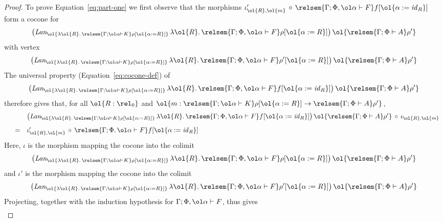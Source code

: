 \documentclass{lmcs}
\theoremstyle{plain}\newtheorem{satz}[thm]{Satz}
\renewcommand{\id}{\mathit{id}}
\begin{document}
\begin{proof}
\vspace*{0.1in}

To prove Equation~\ref{eq:part-one} we first observe that the
morphisms $\iota'_{\ol{R}, \ol{m}} \,\circ\, \relsem{\Gamma; \Phi,
  \ol\alpha \vdash F}f[\ol{\alpha := \id_R}]$ form a cocone for
\[
\big(\textit{Lan}_{\ol{\lambda \ol{R}.\,\relsem{\Gamma; \ol\alpha
      \vdash K}\rho[\ol{\alpha := R}]}}\, \lambda
\ol{R}.\,\relsem{\Gamma; \Phi, \ol\alpha \vdash F}\rho[\ol{\alpha :=
    R}]\big)\, \ol{\relsem{\Gamma; \Phi \vdash A}\rho'}
\]
with vertex 
\[
\big(\textit{Lan}_{\ol{\lambda \ol{R}.\,\relsem{\Gamma; \ol\alpha
      \vdash K}\rho[\ol{\alpha := R}]}}\, \lambda
\ol{R}.\,\relsem{\Gamma; \Phi, \ol\alpha \vdash F}\rho'[\ol{\alpha :=
    R}]\big)\, \ol{\relsem{\Gamma; \Phi \vdash A}\rho'}
\]
The universal property (Equation~\ref{eq:cocone-def}) of
\[
\big(\textit{Lan}_{\ol{\lambda \ol{R}.\,\relsem{\Gamma; \ol\alpha
      \vdash K}\rho[\ol{\alpha := R}]}}\, \lambda
\ol{R}.\,\relsem{\Gamma; \Phi, \ol\alpha \vdash F}f[\ol{\alpha :=
    \id_R}]\big)\, \ol{\relsem{\Gamma; \Phi \vdash A}\rho'}
\]
therefore gives that, for all $\ol{R : \rel_0}$ and $\ol{m :
  \relsem{\Gamma; \ol\alpha \vdash K}\rho[\ol{\alpha := R}] \to
  \relsem{\Gamma; \Phi \vdash A}\rho'}$,
\[\begin{array}{lll}
& & \big(\textit{Lan}_{\ol{\lambda \ol{R}.\,\relsem{\Gamma; \ol\alpha
      \vdash K}\rho[\ol{\alpha := R}]}}\, \lambda
\ol{R}.\,\relsem{\Gamma; \Phi, \ol\alpha \vdash F}f[\ol{\alpha :=
    \id_R}]\big)\, \ol{\relsem{\Gamma; \Phi \vdash A}\rho'} \,\circ\,
\iota_{\ol{R}, \ol{m}}\\[2ex]
& = & \iota'_{\ol{R}, \ol{m}} \,\circ\, \relsem{\Gamma; \Phi,
  \ol\alpha \vdash F}f[\ol{\alpha := \id_R}]
\end{array}\]
Here, $\iota$ is the morphism mapping the cocone into the colimit
\[
\big(\textit{Lan}_{\ol{\lambda \ol{R}.\,\relsem{\Gamma; \ol\alpha
      \vdash K}\rho[\ol{\alpha := R}]}}\, \lambda
\ol{R}.\,\relsem{\Gamma; \Phi, \ol\alpha \vdash F}\rho[\ol{\alpha :=
    R}]\big)\, \ol{\relsem{\Gamma; \Phi \vdash A}\rho'}
\]
and $\iota'$ is the morphism mapping the cocone into the colimit
\[
\big(\textit{Lan}_{\ol{\lambda \ol{R}.\,\relsem{\Gamma; \ol\alpha
      \vdash K}\rho[\ol{\alpha := R}]}}\, \lambda
\ol{R}.\,\relsem{\Gamma; \Phi, \ol\alpha \vdash F}\rho'[\ol{\alpha :=
    R}]\big)\, \ol{\relsem{\Gamma; \Phi \vdash A}\rho'}
\]
Projecting, together with the induction hypothesis for $\Gamma; \Phi,
\ol\alpha\vdash F$, thus gives
\[\begin{array}{lll}

\end{array}\]
\end{proof}
\end{document}
